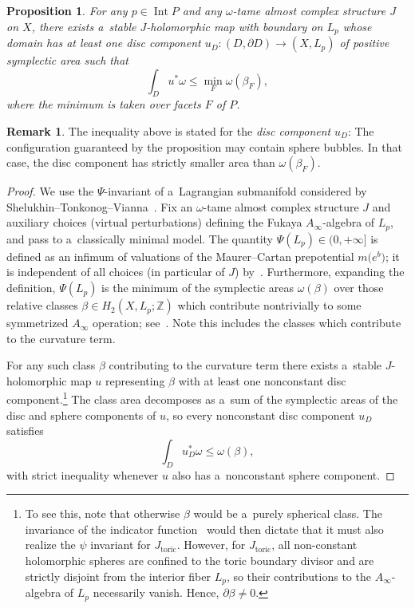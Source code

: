 \documentclass[10pt,a4paper]{amsart}
\numberwithin{equation}{section}
\newcommand{\bZ}{{\mathbb Z}}
\newtheorem{Proposition}[Theorem]{Proposition}
\theoremstyle{definition}
\newtheorem{rem}[Theorem]{Remark}
\begin{document}
\begin{Proposition}\label{prop:toric-disc-Psi}
For any $p\in \operatorname{Int} P$ and any $\omega$-tame almost complex structure $J$ on $X$, there exists a~stable $J$-holomorphic map with boundary on $L_p$ whose domain has at least one disc component $u_D\colon (D,\partial D)\to (X,L_p)$ of positive symplectic area such that
\[
\int_D u^*\omega \le \min_{F}\omega(\beta_F),
\]
where the minimum is taken over facets $F$ of $P$.
\end{Proposition}
\begin{rem}
 The inequality above is stated for the \emph{disc component} $u_D$: The configuration guaranteed by the proposition may contain sphere bubbles. In that case, the disc component has strictly smaller area than $\omega(\beta_F)$.
 \end{rem}
\begin{proof}
We use the $\Psi$-invariant of a~Lagrangian submanifold considered by Shelukhin--Tonko\-nog--Vianna~\cite{STVFluxShape}.
Fix an $\omega$-tame almost complex structure $J$ and auxiliary choices (virtual perturbations) defining the Fukaya $A_\infty$-algebra of $L_p$, and pass to a~classically minimal model.
The quantity $\Psi(L_p)\in(0,+\infty]$ is defined as an infimum of valuations of the Maurer--Cartan prepotential $m\bigl(e^{b}\bigr)$; it is independent of all choices (in particular of $J$) by~\cite[Theorem~4.2]{STVFluxShape}.
Furthermore, expanding the definition, $\Psi(L_p)$ is the minimum of the symplectic areas $\omega(\beta)$ over those relative classes $\beta\in H_{2}(X,L_p;\bZ)$ which contribute nontrivially to some symmetrized $A_\infty$ operation; see~\cite[Theorem~4.8]{STVFluxShape}. Note this includes the classes which contribute to the curvature term.

For any such class $\beta$ contributing to the curvature term there exists a~stable $J$-holomorphic map $u$ representing $\beta$ with at least one nonconstant disc component.\footnote{To see this, note that otherwise $\beta$ would be a~purely spherical class. The invariance of the indicator function~\cite[Proposition~5.1]{STVFluxShape} would then dictate that it must also realize the $\psi$ invariant for $J_{\mathrm{toric}}$.
However, for $J_{\mathrm{toric}}$, all non-constant holomorphic spheres are confined to the toric boundary divisor and are strictly disjoint from the interior fiber $L_p$, so their contributions to the $A_\infty$-algebra of $L_p$ necessarily vanish.
Hence, $\partial \beta \neq 0$.}
The class area decomposes as a~sum of the symplectic areas of the disc and sphere components of $u$, so every nonconstant disc component $u_D$ satisfies
\[
\int_D u_D^*\omega \le \omega(\beta),
\]
with strict inequality whenever $u$ also has a~nonconstant sphere component.


\end{proof}
\end{document}
